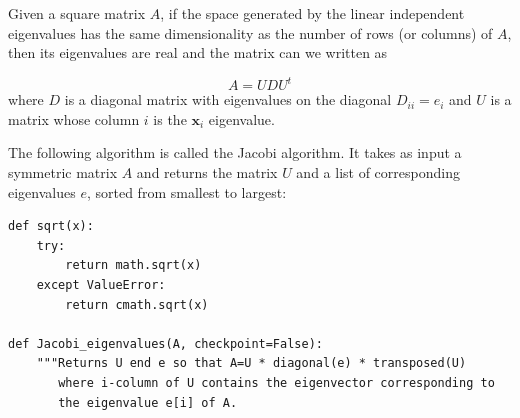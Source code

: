 \documentclass[justified, sixbynine]{tufte-book}
\def\ft{\small\tt}
\theoremstyle{plain}%
\newtheorem * {corollary}{Corollary}
\theoremstyle{definition}
\theoremstyle{remark}
\newtheorem * {remark}{Remark}
\newtheorem * {note}{Note}
\begin{document}
\begin{fullwidth}
Given a square matrix $A$, if the space generated by the linear independent eigenvalues has the same dimensionality as the number of rows (or columns) of $A$, then its eigenvalues are real and the matrix can we written as

\begin{equation}
A = U D U^t
\end{equation}
where
$D$ is a diagonal matrix with eigenvalues on the diagonal $D_{ii} = e_i$ and
$U$ is a matrix whose column $i$ is the $\mathbf{x}_i$ eigenvalue.

The following algorithm is called the Jacobi algorithm. It takes as input a symmetric matrix $A$ and returns the matrix $U$ and a list of corresponding eigenvalues $e$, sorted from smallest to largest:


\begin{lstlisting}[caption={in file: {\ft nlib.py}}]
def sqrt(x):
    try:
        return math.sqrt(x)
    except ValueError:
        return cmath.sqrt(x)

def Jacobi_eigenvalues(A, checkpoint=False):
    """Returns U end e so that A=U * diagonal(e) * transposed(U)
       where i-column of U contains the eigenvector corresponding to
       the eigenvalue e[i] of A.


\end{lstlisting}
\end{fullwidth}
\end{document}
